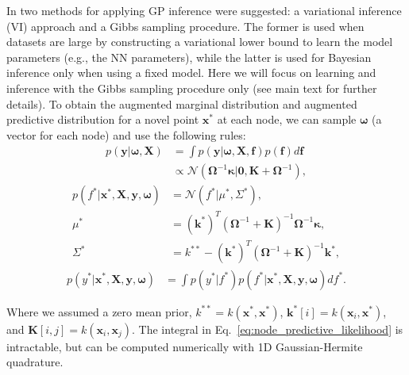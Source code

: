 \documentclass{article}
\def\Eqref#1{Eq.~\ref{#1}}
\newcommand{\normal}{\mathcal{N}}
\newcommand{\bld}[1]{\boldsymbol{#1}}
\def\rvf{{\mathbf{f}}}
\def\rvk{{\mathbf{k}}}
\def\rvx{{\mathbf{x}}}
\def\rvy{{\mathbf{y}}}
\def\rmK{{\mathbf{K}}}
\def\rmX{{\mathbf{X}}}
\newcommand{\K}{\mathbf{K}}
\newcommand{\rvks}{\mathbf{\rvk}^*}
\newcommand{\rvomega}{\bld{\mathbf{\omega}}}
\newcommand{\rvkappa}{\bld{\mathbf{\kappa}}}
\newcommand{\rmOmega}{\mathbf{\Omega}}
\begin{document}
In \cite{achituve2021gp_icml} two methods for applying GP inference were suggested: a variational inference (VI) approach and a Gibbs sampling procedure. The former is used when datasets are large by constructing a variational lower bound to learn the model parameters (e.g., the NN parameters), while the latter is used for Bayesian inference only when using a fixed model. Here we will focus on learning and inference with the Gibbs sampling procedure only (see main text for further details). To obtain the augmented marginal distribution and augmented predictive distribution for a novel point $\rvx^*$ at each node, we can sample $\rvomega$ (a vector for each node) and use the following rules:
\begin{equation} \label{eq:node_marginal_likelihood}
    \begin{aligned}
    p(\rvy | \rvomega, \rmX) &= \int p(\rvy | \rvomega, \rmX, \rvf)p(\rvf)d\rvf \\
    &\propto \normal(\rmOmega^{-1} \rvkappa | \bld{0}, \K + \rmOmega^{-1}),
    \end{aligned}
\end{equation}
\begin{equation} \label{eq:node_predictive_posterior}
    \begin{aligned}
    p(f^* | \rvx^*, \rmX, \rvy, \rvomega) &= \normal({f^* |\mu^*,  \Sigma^*}), \\
    \mu^* &= (\rvks)^T(\rmOmega^{-1} + \K)^{-1} \rmOmega^{-1}\rvkappa,\\
    \Sigma^* &= k^{**} - (\rvks)^T(\rmOmega^{-1} + \K)^{-1}\rvks,
    \end{aligned}
\end{equation}
\begin{equation} \label{eq:node_predictive_likelihood}
    \begin{aligned}
    p(y^* | \rvx^*, \rmX, \rvy, \rvomega) &= \int p(y^* | f^*)p(f^* | \rvx^*, \rmX, \rvy, \rvomega)df^*.
    \end{aligned}
\end{equation}

Where we assumed a zero mean prior, $k^{**} = k(\rvx^*, \rvx^*)$, $\rvk^*[i]=k(\rvx_i, \rvx^*)$, and $\rmK[i,j]=k(\rvx_i,\rvx_j)$. The integral in \Eqref{eq:node_predictive_likelihood} is intractable, but can be computed numerically with 1D Gaussian-Hermite quadrature.
\end{document}
